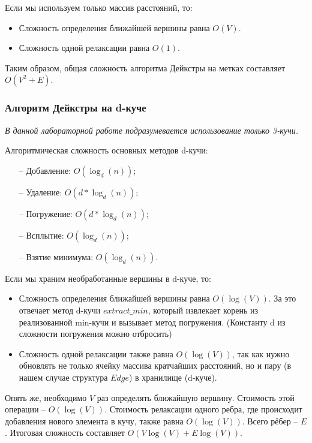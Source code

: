 \begin{text}
Если мы используем только массив расстояний, то:
\begin{itemize}
	\item Сложность определения ближайшей вершины равна $O(V)$.
	\item Сложность одной релаксации равна $O(1)$.
\end{itemize}

Таким образом, общая сложность алгоритма Дейкстры на метках составляет \textbf{$O(V^2 + E)$}.\\

\subsubsection{Алгоритм Дейкстры на d-куче}
\textit{В данной лабораторной работе подразумевается использование только 3-кучи.}

Алгоритмическая сложность основных методов d-кучи:
\begin{enumerate}
	\item[--] Добавление: $O(\log_d(n))$;
	\item[--] Удаление: $O(d * \log_d(n))$;
	\item[--] Погружение: $O(d * \log_d(n))$;
	\item[--] Всплытие: $O(\log_d(n))$;
	\item[--] Взятие минимума: $O(\log_d(n))$.
\end{enumerate}

Если мы храним необработанные вершины в d-куче, то:
\begin{itemize}
	\item Сложность определения ближайшей вершины равна $O(\log(V))$. За это отвечает метод d-кучи $extract\_min$, который извлекает корень из реализованной min-кучи и вызывает метод погружения. (Константу d из сложности погружения можно отбросить)
	\item Сложность одной релаксации также равна $O(\log(V))$, так как нужно обновлять не только ячейку массива кратчайших расстояний, но и пару (в нашем случае структура $Edge$) в хранилище (d-куче).
\end{itemize}

Опять же, необходимо $V$ раз определять ближайшую вершину. Стоимость этой операции -- $O(\log(V))$. Стоимость релаксации одного ребра, где происходит добавления нового элемента в кучу, также равна $O(\log(V))$. Всего рёбер -- $E$. Итоговая сложность составляет $O(V\log(V) + E\log(V))$.\\


\end{text}
